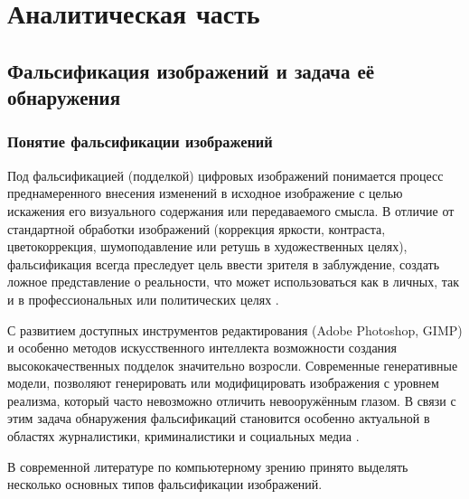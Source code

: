 \chapter{Аналитическая часть}


\section{Фальсификация изображений и задача её обнаружения}

\subsection{Понятие фальсификации изображений}

Под фальсификацией (подделкой) цифровых изображений понимается процесс преднамеренного внесения изменений в исходное изображение с целью искажения его визуального содержания или передаваемого смысла. В отличие от стандартной обработки изображений (коррекция яркости, контраста, цветокоррекция, шумоподавление или ретушь в художественных целях), фальсификация всегда преследует цель ввести зрителя в заблуждение, создать ложное представление о реальности, что может использоваться как в личных, так и в профессиональных или политических целях \cite{1}.

С развитием доступных инструментов редактирования (Adobe Photoshop, GIMP) и особенно методов искусственного интеллекта возможности создания высококачественных подделок значительно возросли. Современные генеративные модели, позволяют генерировать или модифицировать изображения с уровнем реализма, который часто невозможно отличить невооружённым глазом. В связи с этим задача обнаружения фальсификаций становится особенно актуальной в областях журналистики, криминалистики и социальных медиа \cite{2}.

В современной литературе по компьютерному зрению принято выделять несколько основных типов фальсификации изображений\cite{3}.

